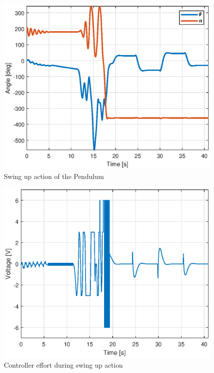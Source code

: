 \documentclass[superscriptaddress,floatfix,reprint,amssymb, amsmath,aps, pre]{revtex4-1}
\begin{document}
{{{            \begin{figure}
                \includegraphics[width = \linewidth]{SwingUpAction.eps}
                \caption{Swing up action of the Pendulum}
                \label{fig:SwingUpAction}
            \end{figure}
            \begin{figure}
                \includegraphics[width = \linewidth]{controllerEffortSwing.eps}
                \caption{Controller effort during swing up action}
                \label{fig:controllerEffortSwing}
            \end{figure}
            
}}}
\end{document}
